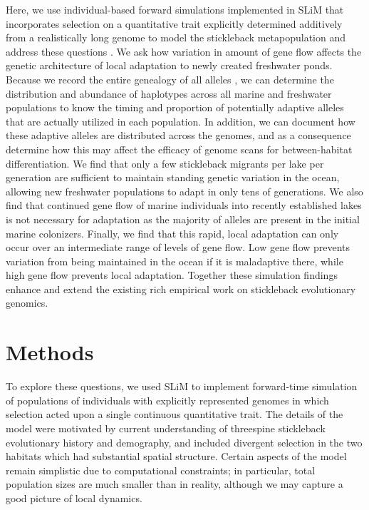 \documentclass{article}
\begin{document}
Here, we use individual-based forward simulations implemented in SLiM that incorporates selection on a quantitative trait
explicitly determined additively from a realistically long genome to model the stickleback metapopulation and address these questions \citep{haller2017slim,haller2018slim3}. 
We ask how variation in amount of gene flow affects the genetic architecture of local adaptation to newly created freshwater ponds.
Because we record the entire genealogy of all alleles \citep{kelleher2018efficient}, 
we can determine the distribution and abundance of haplotypes across all marine and freshwater populations to know the timing and proportion of potentially adaptive alleles that are actually utilized in each population. 
In addition, we can document how these adaptive alleles are distributed across the genomes, and as a consequence determine how this may affect the efficacy of genome scans for between-habitat differentiation. 
We find that only a few stickleback migrants per lake per generation are sufficient to maintain standing genetic variation in the ocean, allowing new freshwater populations to adapt in only tens of generations. 
We also find that continued gene flow of marine individuals into recently established lakes is not necessary for adaptation as the majority of alleles are present in the initial marine colonizers. 
Finally, we find that this rapid, local adaptation can only occur over an intermediate range of levels of gene flow. 
Low gene flow prevents variation from being 
maintained in the ocean if it is maladaptive there, while high gene flow prevents local adaptation. 
Together these simulation findings enhance and extend the existing rich empirical work on stickleback evolutionary genomics.

\section*{Methods}

To explore these questions, we used SLiM \citep{haller2017slim,haller2018slim3} to implement forward-time simulation of populations of individuals with explicitly represented genomes in which selection acted upon a single continuous quantitative trait. 
The details of the model were motivated by current understanding of threespine stickleback evolutionary history and demography, and included divergent selection in the two habitats which had substantial spatial structure. 
Certain aspects of the model remain simplistic due to computational constraints;
in particular, total population sizes are much smaller than in reality,
although we may capture a good picture of local dynamics.
\end{document}
